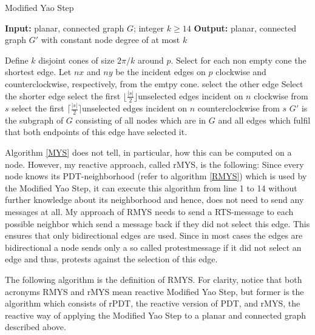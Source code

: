\algrenewcommand\algorithmicprocedure{\textbf{}}
\begin{algorithm}\small
\caption{Modified Yao Step}\label{MYS}
\begin{algorithmic}[1]
\Statex \textbf{Input:} planar, connected graph $G $; integer $k\geq 14 $
\Statex \textbf{Output:} planar, connected graph $G' $ with constant node degree of at most $k $

\Statex

	\State Define $k $ disjoint cones of size $2\pi/k $ around $p $.
	\State Select for each non empty cone the shortest edge.
			\State Let $nx $ and $ny $ be the incident edges on $p $ clockwise and \State counterclockwise, respectively, from the emtpy cone.
				\State select the other edge
				\Else
				\State Select the shorter edge
			\EndIf 
		\Else
			\State select the first $\lfloor \frac{|s|}{2} \rfloor $unselected edges incident on $n $ clockwise from $s $
			\State select the first $\lceil \frac{|s|}{2} \rceil $unselected edges incident on $n $ counterclockwise from $s $
		\EndIf
	\EndFor
\EndFor
\Statex $ G' $ is the subgraph of $G $ consisting of all nodes which are in $G $ and all edges which fulfil that both endpoints of this edge have selected it. 
\end{algorithmic}
\end{algorithm}
 
Algorithm \ref{MYS} does not tell, in particular, how this can be computed on a node.
However, my reactive approach, called rMYS, is the following: Since every node knows its PDT-neighborhood (refer to algorithm \ref{RMYS}) which is used by the Modified Yao Step, it can execute this algorithm from line 1 to 14 without further knowledge about its neighborhood and hence, does not need to send any messages at all.
My approach of RMYS needs to send a RTS-message to each possible neighbor which send a message back if they did not select this edge.
This ensures that only bidirectional edges are used.
Since in most cases the edges are bidirectional a node sends only a so called protestmessage if it did not select an edge and thus, protests against the selection of this edge.

The following algorithm is the definition of RMYS.
For clarity, notice that both acronyms RMYS and rMYS mean \grqq reactive Modified Yao Step\grqq, but former is the algorithm which consists of rPDT, the reactive version of PDT, and rMYS, the reactive way of applying the Modified Yao Step to a planar and connected graph described above.
 
